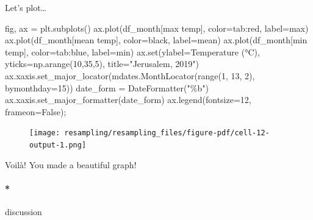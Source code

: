 \documentclass[
  letterpaper,
  DIV=11,
  numbers=noendperiod,
  oneside]{scrreprt}
\let\oldparagraph\paragraph
\renewcommand{\paragraph}[1]{\oldparagraph{#1}\mbox{}}
\newenvironment{Shaded}{\begin{snugshade}}{\end{snugshade}}
\newcommand{\BuiltInTok}[1]{\textcolor[rgb]{0.00,0.23,0.31}{#1}}
\newcommand{\DecValTok}[1]{\textcolor[rgb]{0.68,0.00,0.00}{#1}}
\newcommand{\NormalTok}[1]{\textcolor[rgb]{0.00,0.23,0.31}{#1}}
\newcommand{\OperatorTok}[1]{\textcolor[rgb]{0.37,0.37,0.37}{#1}}
\newcommand{\StringTok}[1]{\textcolor[rgb]{0.13,0.47,0.30}{#1}}
\newcommand{\VariableTok}[1]{\textcolor[rgb]{0.07,0.07,0.07}{#1}}
\begin{document}
Let's plot\ldots{}

\begin{Shaded}
\begin{Highlighting}[]
\NormalTok{fig, ax }\OperatorTok{=}\NormalTok{ plt.subplots()}
\NormalTok{ax.plot(df\_month[}\StringTok{\textquotesingle{}max temp\textquotesingle{}}\NormalTok{], color}\OperatorTok{=}\StringTok{\textquotesingle{}tab:red\textquotesingle{}}\NormalTok{, label}\OperatorTok{=}\StringTok{\textquotesingle{}max\textquotesingle{}}\NormalTok{)}
\NormalTok{ax.plot(df\_month[}\StringTok{\textquotesingle{}mean temp\textquotesingle{}}\NormalTok{], color}\OperatorTok{=}\StringTok{\textquotesingle{}black\textquotesingle{}}\NormalTok{, label}\OperatorTok{=}\StringTok{\textquotesingle{}mean\textquotesingle{}}\NormalTok{)}
\NormalTok{ax.plot(df\_month[}\StringTok{\textquotesingle{}min temp\textquotesingle{}}\NormalTok{], color}\OperatorTok{=}\StringTok{\textquotesingle{}tab:blue\textquotesingle{}}\NormalTok{, label}\OperatorTok{=}\StringTok{\textquotesingle{}min\textquotesingle{}}\NormalTok{)}
\NormalTok{ax.}\BuiltInTok{set}\NormalTok{(ylabel}\OperatorTok{=}\StringTok{\textquotesingle{}Temperature (°C)\textquotesingle{}}\NormalTok{,}
\NormalTok{       yticks}\OperatorTok{=}\NormalTok{np.arange(}\DecValTok{10}\NormalTok{,}\DecValTok{35}\NormalTok{,}\DecValTok{5}\NormalTok{),}
\NormalTok{       title}\OperatorTok{=}\StringTok{"Jerusalem, 2019"}\NormalTok{)}
\NormalTok{ax.xaxis.set\_major\_locator(mdates.MonthLocator(}\BuiltInTok{range}\NormalTok{(}\DecValTok{1}\NormalTok{, }\DecValTok{13}\NormalTok{, }\DecValTok{2}\NormalTok{), bymonthday}\OperatorTok{=}\DecValTok{15}\NormalTok{))}
\NormalTok{date\_form }\OperatorTok{=}\NormalTok{ DateFormatter(}\StringTok{"\%b"}\NormalTok{)}
\NormalTok{ax.xaxis.set\_major\_formatter(date\_form)}
\NormalTok{ax.legend(fontsize}\OperatorTok{=}\DecValTok{12}\NormalTok{, frameon}\OperatorTok{=}\VariableTok{False}\NormalTok{)}\OperatorTok{;}
\end{Highlighting}
\end{Shaded}

\begin{figure}[H]

{\centering \texttt{[image: resampling/resampling\_files/figure-pdf/cell-12-output-1.png]}

}

\end{figure}

Voilà! You made a beautiful graph!

\hypertarget{discussion-4}{%
\paragraph*{discussion}\label{discussion-4}}
\end{document}
